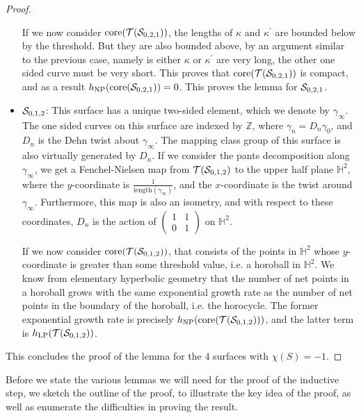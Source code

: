 \documentclass[12pt, reqno]{amsart}
\begin{document}
\begin{proof}
\begin{itemize}
    If we now consider $\mathrm{core}(\mathcal{T}(\mathcal{S}_{0,2,1}))$, the lengths of $\kappa$ and $\kappa^{\prime}$ are bounded below by the threshold.
    But they are also bounded above, by an argument similar to the previous case, namely is either $\kappa$ or $\kappa^{\prime}$ are very long, the other one sided curve must be very short.
    This proves that $\mathrm{core}(\mathcal{T}(\mathcal{S}_{0,2,1}))$ is compact, and as a result $h_{\mathrm{NP}}(\mathrm{core}(\mathcal{S}_{0,2,1})) = 0$.
    This proves the lemma for $\mathcal{S}_{0,2,1}$.
  \item $\mathcal{S}_{0,1,2}$: This surface has a unique two-sided element, which we denote by $\gamma_{\infty}$.
    The one sided curves on this surface are indexed by $\mathbb{Z}$, where $\gamma_n = D_n \gamma_0$, and $D_n$ is the Dehn twist about $\gamma_\infty$.
    The mapping class group of this surface is also virtually generated by $D_n$.
    If we consider the pants decomposition along $\gamma_{\infty}$, we get a Fenchel-Nielsen map from $\mathcal{T}(\mathcal{S}_{0,1,2})$ to the upper half plane $\mathbb{H}^2$, where the $y$-coordinate is $\frac{1}{\mathrm{length}(\gamma_{\infty})}$, and the $x$-coordinate is the twist around $\gamma_{\infty}$.
    Furthermore, this map is also an isometry, and with respect to these coordinates, $D_n$ is the action of $
    \begin{pmatrix}
      1 & 1 \\
      0 & 1
    \end{pmatrix}
    $ on $\mathbb{H}^2$.

    If we now consider $\mathrm{core}(\mathcal{T}(\mathcal{S}_{0,1,2}))$, that consists of the points in $\mathbb{H}^2$ whose $y$-coordinate is greater than some threshold value, i.e. a horoball in $\mathbb{H}^2$.
    We know from elementary hyperbolic geometry that the number of net points in a horoball grows with the same exponential growth rate as the number of net points in the boundary of the horoball, i.e. the horocycle.
    The former exponential growth rate is precisely $h_{\mathrm{NP}}(\mathrm{core}(\mathcal{T}(\mathcal{S}_{0,1,2})))$, and the latter term is $h_{\mathrm{LP}}(\mathcal{T}(\mathcal{S}_{0,1,2}))$.
  \end{itemize}
  This concludes the proof of the lemma for the $4$ surfaces with $\chi(S) = -1$.
\end{proof}

Before we state the various lemmas we will need for the proof of the inductive step, we sketch the outline of the proof, to illustrate the key idea of the proof, as well as enumerate the difficulties in proving the result.
\end{document}
